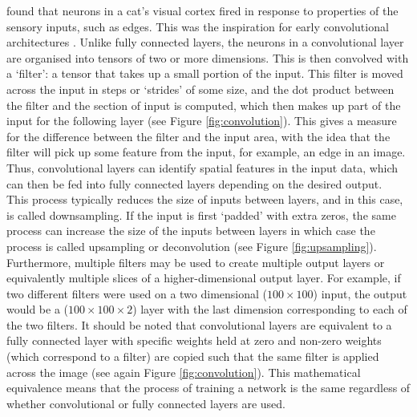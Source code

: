 \documentclass[11pt,a4paper,onecolumn]{report}
\begin{document}
\citet{hubel_receptive_1959} found that neurons in a cat's visual cortex fired
in response to properties of the sensory inputs, such as edges. This was the
inspiration for early convolutional architectures
\citep{fukushima_neocognitron_1980}. Unlike fully connected layers, the neurons
in a convolutional layer are organised into tensors of two or more dimensions.
This is then convolved with a `filter': a tensor that takes up a small portion
of the input. This filter is moved across the input in steps or `strides' of
some size, and the dot product between the filter and the section of input is
computed, which then makes up part of the input for the following layer (see
Figure \ref{fig:convolution}). This gives a measure for the difference between
the filter and the input area, with the idea that the filter will pick up some
feature from the input, for example, an edge in an image. Thus, convolutional
layers can identify spatial features in the input data, which can then be fed
into fully connected layers depending on the desired output. \\

This process typically reduces the size of inputs between layers, and in this case, is called
downsampling. If the input is first `padded' with extra zeros, the same process
can increase the size of the inputs between layers in which case the process is
called upsampling or deconvolution (see Figure \ref{fig:upsampling}).
Furthermore, multiple filters may be used to create multiple output layers or
equivalently multiple slices of a higher-dimensional output layer. For example,
if two different filters were used on a two dimensional ($100 \times 100$) input,
the output would be a ($100 \times 100 \times 2$) layer with the last dimension
corresponding to each of the two filters. It should be noted that convolutional
layers are equivalent to a fully connected layer with specific weights held at
zero and non-zero weights (which correspond to a filter) are copied such that
the same filter is applied across the image (see again Figure
\ref{fig:convolution}). This mathematical equivalence means that the process of
training a network is the same regardless of whether convolutional or fully
connected layers are used.
\end{document}
